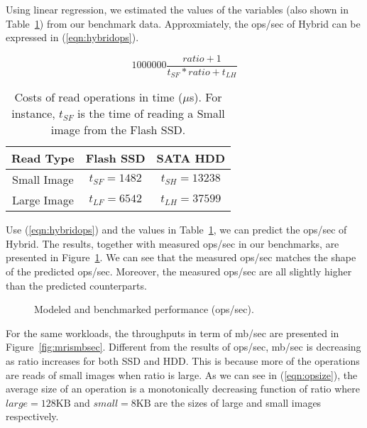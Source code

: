 Using linear regression, we estimated the values of the variables
(also shown in Table~\ref{tbl:variable}) from our benchmark data.
Approxmiately, the ops/sec of Hybrid can be expressed in
(\ref{eqn:hybridops}).

\begin{equation}
\label{eqn:hybridops}
    1000000 \frac{ratio + 1}{t_{SF} * ratio + t_{LH}}
\end{equation}

\begin{table}[tc]
{\centering \footnotesize
\begin{tabular}{c|c|c}
\hline 
  Read Type & Flash SSD & SATA HDD \\ \hline
  Small Image & $t_{SF} = 1482$ & $t_{SH} = 13238$ \\ 
  Large Image & $t_{LF} = 6542$ & $t_{LH} = 37599$ \\ \hline
\end{tabular}
 \caption{Costs of read operations in time ($\mu$s). For instance,
$t_{SF}$ is the time of reading a Small image from the Flash SSD.}
\label{tbl:variable}
}
\end{table}

Use (\ref{eqn:hybridops}) and the values in Table~\ref{tbl:variable},
we can predict the ops/sec of Hybrid. The results, together with
measured ops/sec in our benchmarks, are presented in
Figure~\ref{fig:opspred}. We can see that the measured ops/sec
matches the shape of the predicted ops/sec. Moreover, the measured
ops/sec are all slightly higher than the predicted counterparts.


\begin{figure}[t]
\begin{centering}
\caption{Modeled and benchmarked performance (ops/sec).}
\label{fig:opspred}
\end{centering}
\end{figure}

For the same workloads, the throughputs in term of mb/sec are
presented in Figure~\ref{fig:mrismbsec}. Different from the results of
ops/sec, mb/sec is decreasing as ratio increases for both SSD and
HDD. This is because more of the operations are reads of small images
when ratio is large. As we can see in (\ref{eqn:opsize}), the average
size of an operation is a monotonically decreasing function of ratio
where $large = 128\mbox{KB}$ and $small = 8\mbox{KB}$ are the sizes of
large and small images respectively.


